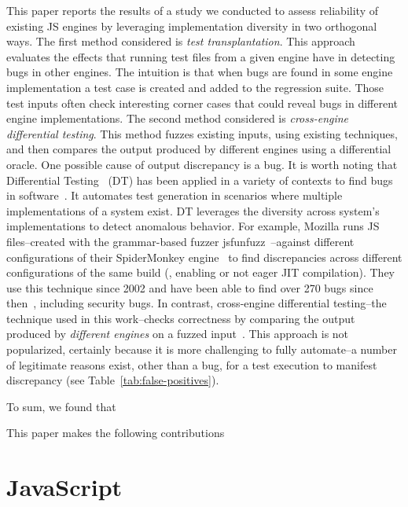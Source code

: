 \documentclass[10pt,conference,anonymous]{IEEEtran}
\begin{document}
This paper reports the results of a study we conducted to assess
reliability of existing JS engines by leveraging implementation
diversity in two orthogonal ways. The first method considered is
\emph{test transplantation}. This approach evaluates the effects that
running \js{} test files from a given engine have in detecting bugs in
other engines. The intuition is that when bugs are found in some
engine implementation a test case is created and added to the
regression suite. Those test inputs often check interesting corner
cases that could reveal bugs in different engine implementations. The
second method considered is \emph{cross-engine differential
  testing}. This method fuzzes existing inputs, using existing
techniques, and then compares the output produced by different engines
using a differential oracle. One possible cause of output discrepancy
is a bug. It is worth noting that Differential
Testing~\cite{Brumley-etal-ss07} (DT) has been applied in a variety of
contexts to find bugs in
software~\cite{Yang-etal-pldi11,Chen-etal-fse2015,Argyros-etla-ccs16,Chen-etal-pldi16,petsios-etal-sp2017,SivakornAPKJ17,Zhang:2017:ATD:3097368.3097448}. It
automates test generation in scenarios where multiple implementations
of a system exist. DT leverages the diversity across system's
implementations to detect anomalous behavior. For example, Mozilla
runs JS files--created with the grammar-based fuzzer
jsfunfuzz~\cite{jsfunfuzz}--against different configurations of their
SpiderMonkey engine~\cite{jsfunfuzz-mozilla-bug} to find discrepancies
across different configurations of the same build (\eg{}, enabling or
not eager JIT compilation). They use this technique since 2002 and
have been able to find over 270 bugs since
then~\cite{jsfunfuzz-at-mozilla}, including security bugs.  In
contrast, cross-engine differential testing--the technique used in
this work--checks correctness by comparing the output produced by
\emph{different engines} on a fuzzed
input~\cite{patra2016learning}. This approach is not popularized,
certainly because it is more challenging to fully automate--a number
of legitimate reasons exist, other than a bug, for a test execution to
manifest discrepancy (see Table~\ref{tab:false-positives}).

To sum, we found that 

This paper makes the following contributions 

\section{JavaScript}
\label{sec:es6-design}
\end{document}
